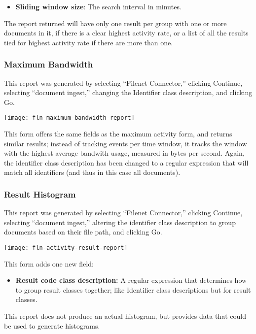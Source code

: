 \begin{changemargin}{1.5in}{0in}
\begin{itemize}
\item \textbf{Sliding window size}: The search interval in minutes.

\end{itemize}

The report returned will have only one result per group with one or more
documents in it, if there is a clear highest activity rate, or a list of
all the results tied for highest activity rate if there are more than one.

\subsubsection{Maximum Bandwidth}

This report was generated by selecting ``Filenet Connector,'' clicking
Continue, selecting ``document ingest,'' changing the Identifier class
description, and clicking Go.

\texttt{[image: fln-maximum-bandwidth-report]}

This form offers the same fields as the maximum activity form, and
returns similar results; instead of tracking events per time window,
it tracks the window with the highest average bandwith usage, measured
in bytes per second. Again, the identifier class description has been
changed to a regular expression that will match all identifiers (and
thus in this case all documents).

\subsubsection{Result Histogram}

This report was generated by selecting ``Filenet Connector,'' clicking
Continue, selecting ``document ingest,'' altering the identifier class
description to group documents based on their file path, and clicking
Go.

\texttt{[image: fln-activity-result-report]}

This form adds one new field:

\begin{itemize}

\item \textbf{Result code class description:} A regular expression that
determines how to group result classes together; like Identifier class
descriptions but for result classes.

\end{itemize}

This report does not produce an actual histogram, but provides data that
could be used to generate histograms.  

\end{changemargin}
